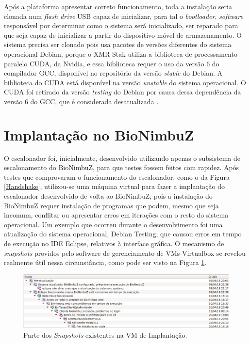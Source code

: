 Após a plataforma apresentar correto funcionamento, toda a instalação seria clonada num \textit{flash drive} \acrshort{USB} capaz de inicializar, para tal o \textit{bootloader}, \textit{software} responsável por determinar como o sistema será inicializado, ser reparado para que seja capaz de inicializar a partir do dispositivo móvel de armazenamento. O sistema precisa ser clonado pois usa pacotes de versões diferentes do sistema operacional Debian\cite{Debian}, porque o XMR-Stak utiliza a biblioteca de processamento paralelo \acrshort{CUDA}\cite{CUDA}, da Nvidia\cite{NVIDIA}, e essa biblioteca requer o uso da versão 6 do compilador \acrshort{GCC}\cite{GCC}, disponível no repositório da versão \textit{stable} do Debian. A biblioteca do CUDA está disponível na versão \textit{unstable} do sistema operacional. O \acrshort{CUDA} foi retirado da versão \textit{testing} do Debian por causa dessa dependência da versão 6 do \acrshort{GCC}, que é considerada desatualizada \cite{CUDA_BUGREP}.


\section{Implantação no BioNimbuZ}

O escalonador foi, inicialmente, desenvolvido utilizando apenas o subsistema de escalonamento do BioNimbuZ, para que testes fossem feitos com rapidez. Após testes que comprovaram o funcionamento do escalonador, como o da Figura \ref{Handshake}, utilizou-se uma máquina virtual para fazer a implantação do escalonador desenvolvido de volta ao BioNimbuZ, pois a instalação do BioNimbuZ requer instalação de programas que podem, mesmo que seja incomum, conflitar ou apresentar erros em iterações com o resto do sistema operacional. Um exemplo que ocorreu durante o desenvolvimento foi uma atualização do sistema operacional, Debian\cite{Debian} Testing\cite{DebianTesting}, que causou erros em tempo de execução no \acrfull{IDE} Eclipse\cite{JavaEclipse}, relativos à interface gráfica. O mecanismo de \textit{snapshots} providos pelo software de gerenciamento de \acrshort{VM}s Virtualbox\cite{VirtualBox} se revelou realmente útil nessa circunstância, como pode ser visto na Figura \ref{Snapshots}.

\begin{figure}[htbp]
	\centerline{\includegraphics[width=16cm]{img/Snapshots.png}}
	\caption{Parte dos \textit{Snapshots} existentes na \acrshort{VM} de Implantação.}
	\label{Snapshots}
\end{figure}

